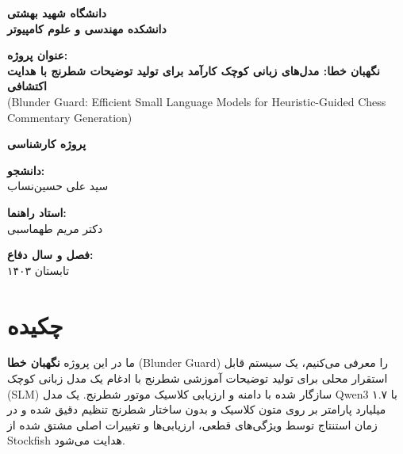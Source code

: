 \documentclass[a4paper,12pt]{report}
\begin{document}
\begin{titlepage}
\begin{center}
\vspace*{1cm}

{\Large \textbf{دانشگاه شهید بهشتی}}\\
\vspace{0.5cm}
{\large \textbf{دانشکده مهندسی و علوم کامپیوتر}}\\
\vspace{2cm}

{\Large \textbf{عنوان پروژه:}}\\
\vspace{0.5cm}
{\LARGE \textbf{نگهبان خطا: مدل‌های زبانی کوچک کارآمد برای تولید توضیحات شطرنج با هدایت اکتشافی}}\\
\vspace{1cm}
{\large (Blunder Guard: Efficient Small Language Models for Heuristic-Guided Chess Commentary Generation)}\\
\vspace{2cm}

{\large \textbf{پروژه کارشناسی}}\\
\vspace{2cm}

{\large \textbf{دانشجو:}}\\
{\large سید علی حسین‌نساب}\\
\vspace{1cm}

{\large \textbf{استاد راهنما:}}\\
{\large دکتر مریم طهماسبی}\\
\vspace{2cm}

{\large \textbf{فصل و سال دفاع:}}\\
{\large تابستان ۱۴۰۳}\\ %

\vfill
\end{center}
\end{titlepage}

\chapter*{چکیده}
ما در این پروژه \textbf{نگهبان خطا} (Blunder Guard) را معرفی می‌کنیم، یک سیستم قابل استقرار محلی برای تولید توضیحات آموزشی شطرنج با ادغام یک مدل زبانی کوچک (SLM) سازگار شده با دامنه و ارزیابی کلاسیک موتور شطرنج. یک مدل Qwen3 با ۱.۷ میلیارد پارامتر بر روی متون کلاسیک و بدون ساختار شطرنج تنظیم دقیق شده و در زمان استنتاج توسط ویژگی‌های قطعی، ارزیابی‌ها و تغییرات اصلی مشتق شده از Stockfish هدایت می‌شود.
\end{document}
